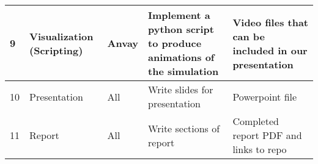 \documentclass[letterpaper]{article}
\begin{document}
\begin{table}[h]
{\begin{tabular}{|p{0.25cm}|p{4cm}|p{2.3cm}|p{6cm}|p{4cm}|}
     9 & Visualization (Scripting)& Anvay & Implement a python script to produce animations of the simulation & Video files that can be included in our presentation\\\hline
     
     10 & Presentation& All & Write slides for presentation  & Powerpoint file \\\hline
     
     11 & Report& All & Write sections of report  &  Completed report PDF and links to repo\\\hline
    \end{tabular}
    }
\end{table}




\end{document}
